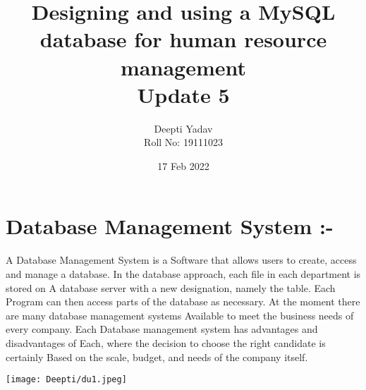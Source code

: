 \documentclass{article}
\title{ Designing and using a MySQL database for human resource management\\ Update 5}
\date{17 Feb 2022}
\author{Deepti Yadav\\ Roll No: 19111023 }
\begin{document}
\maketitle
\section*{Database Management System :- } A Database Management System is a Software that allows users to create,
access and manage a database. In the database approach, each file in each
department is stored on A database server with a new designation, namely
the table. Each Program can then access parts of the database as necessary.
At the moment there are many database management systems Available to
meet the business needs of every company. Each Database management system has advantages and disadvantages of Each, where the decision to choose
the right candidate is certainly Based on the scale, budget, and needs of the
company itself.

\texttt{[image: Deepti/du1.jpeg]}
\end{document}
